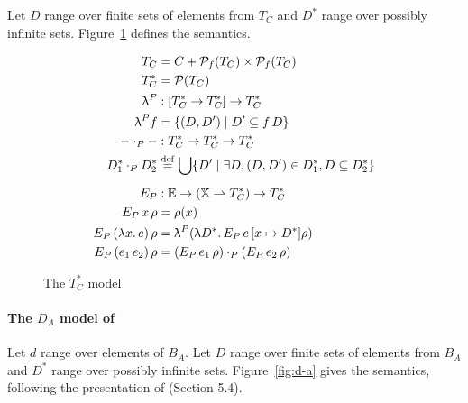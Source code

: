 \documentclass{tufte-handout}
\newcommand{\defeq}[0]{\overset{\mathrm{def}}{=}}
\newcommand{\LAM}[1]{\lambda #1.\,}
\newcommand{\pto}[0]{\rightharpoonup}
\newcommand{\VAR}[0]{\mathbb{X}}
\begin{document}
  Let $D$ range over finite sets of elements from $T_C$
  and $D^{*}$ range over possibly infinite sets.
  Figure~\ref{fig:t-c} defines the semantics.
  

\begin{figure}[tbp]
\begin{align*}
  T_C &= C + \mathcal{P}_f(T_C) \times \mathcal{P}_f(T_C) \\
  T^{*}_C &= \mathcal{P}(T_C) \\
  \uplambda^P &: [T^{*}_C \to T^{*}_C] \to T^{*}_C \\
  \uplambda^P f &= \{ (D,D') \mid D' \subseteq f\,D \} \\
  - \cdot_P - &: T^{*}_C \to T^{*}_C \to T^{*}_C \\
  D^{*}_1 \cdot_P D^{*}_2 &\defeq 
     \bigcup\{ D'\mid \exists D, (D,D') \in D^{*}_1, D \subseteq D^{*}_2\}\\[1ex]
\EP&: \mathbb{E} \to (\VAR\pto T^{*}_C) \to T^{*}_C\\
\PSEM{ x }\rho &= \rho(x) \\
\PSEM{ (\LAM{x} e) }\rho &= \uplambda^P (\uplambda D^{*}.\, \PSEM{e}[x\mapsto D^{*}]\rho) \\
\PSEM{ (e_1\,e_2) }\rho &= (\PSEM{ e_1 }\rho) \cdot_P (\PSEM{ e_2 }\rho)
\end{align*}
\caption{The $T^{*}_C$ model}
\label{fig:t-c}
\end{figure}


\paragraph{The $D_A$ model of \citet{Engeler:1981aa}}
\label{sec:d-a}

\newcommand{\EE}[0]{E_E}
\newcommand{\ESEM}[1]{\EE\, #1 \,}


  Let $d$ range over elements of $B_A$.
  Let $D$ range over finite sets of elements from $B_A$ and $D^{*}$
  range over possibly infinite sets.  Figure~\ref{fig:d-a} gives the
  semantics, following the presentation of
  \citet{barendregt84:_lambda_calculus} (Section 5.4).
  
\end{document}
